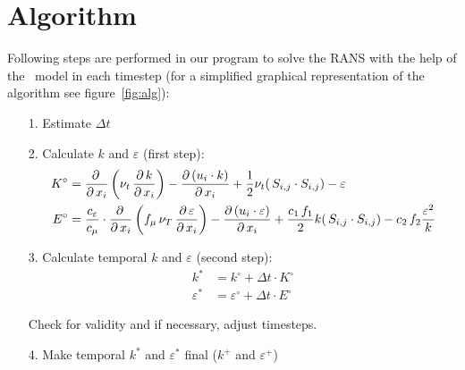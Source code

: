 \section*{Algorithm}
Following steps are performed in our program to solve the RANS with the help of the \ke\, model in each timestep (for a simplified graphical representation of the algorithm see figure~\ref{fig:alg}):
\begin{itemize}
\item[1.] Estimate $\Delta t$
\item[2.] Calculate $k$ and $\varepsilon$ (first step):
\begin{align}\label{KK1}
K^\circ&=
\frac{\partial\,}{\partial\,x_i}\left(\nu_t\,\frac{\partial\,k}{\partial\,x_i}\right)
-
\frac{\partial\,(u_i\cdot k)}{\partial\,x_i}
+
\frac{1}{2}\nu_t
(\,S_{i,j} \cdot S_{i,j})
-
\varepsilon
\\\label{EE1}
E^\circ&=\frac{c_\varepsilon}{c_\mu}\cdot
\frac{\partial\,}{\partial\,x_i}\left(f_\mu\,\nu_T\,\frac{\partial\,\varepsilon}{\partial\,x_i}\right)
-
\frac{\partial\,(u_i\cdot \varepsilon)}{\partial\,x_i}
+
\frac{c_1\,f_1}{2}k
(\,S_{i,j} \cdot S_{i,j})
-
c_2\,f_2\frac{\varepsilon^2}{k}
\end{align}\vspace{-0.5cm}



\item[3.] Calculate temporal $k$ and $\varepsilon$ (second step):
\begin{align}
k^* &= k^\circ + \Delta t \cdot K^\circ\\
\varepsilon^* &= \varepsilon^\circ + \Delta t \cdot E^\circ
\end{align}\vspace{-0.5cm}

Check for validity and if necessary, adjust timesteps.

\item[4.] Make temporal $k^*$ and $\varepsilon^*$ final ($k^+$ and $\varepsilon^+$)


\end{itemize}

